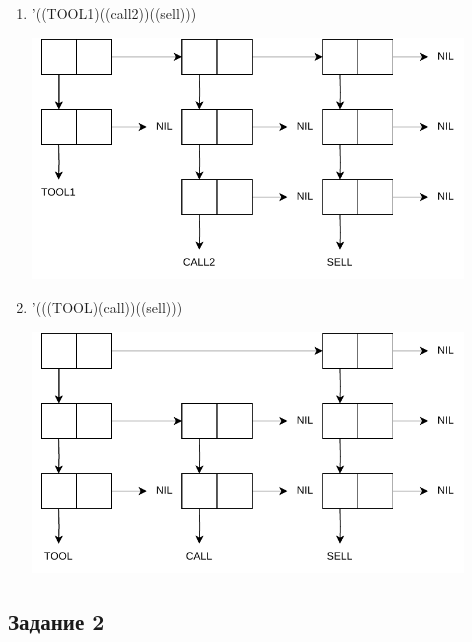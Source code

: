 \documentclass[a4paper,oneside,14pt]{extarticle}
\begin{document}
\begin{enumerate}
\newpage

\item '((TOOL1)((call2))((sell)))
\begin{center}
    \includegraphics[width=0.9\textwidth]{img/list5.pdf}
\end{center}

\item '(((TOOL)(call))((sell)))
\begin{center}
    \includegraphics[width=0.9\textwidth]{img/list6.pdf}
\end{center}
\end{enumerate}


\newpage
\subsection{Задание 2}
\end{document}
